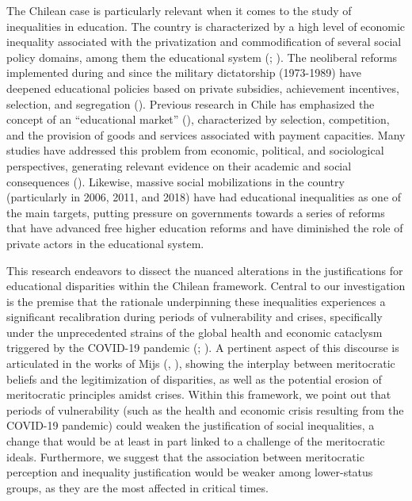 \documentclass[
  12pt,
  a4paper,
]{article}
\begin{document}
The Chilean case is particularly relevant when it comes to the study of inequalities in education. The country is characterized by a high level of economic inequality associated with the privatization and commodification of several social policy domains, among them the educational system (; ). The neoliberal reforms implemented during and since the military dictatorship (1973-1989) have deepened educational policies based on private subsidies, achievement incentives, selection, and segregation (). Previous research in Chile has emphasized the concept of an ``educational market'' (), characterized by selection, competition, and the provision of goods and services associated with payment capacities. Many studies have addressed this problem from economic, political, and sociological perspectives, generating relevant evidence on their academic and social consequences (). Likewise, massive social mobilizations in the country (particularly in 2006, 2011, and 2018) have had educational inequalities as one of the main targets, putting pressure on governments towards a series of reforms that have advanced free higher education reforms and have diminished the role of private actors in the educational system.

This research endeavors to dissect the nuanced alterations in the justifications for educational disparities within the Chilean framework. Central to our investigation is the premise that the rationale underpinning these inequalities experiences a significant recalibration during periods of vulnerability and crises, specifically under the unprecedented strains of the global health and economic cataclysm triggered by the COVID-19 pandemic (; ). A pertinent aspect of this discourse is articulated in the works of Mijs (, ), showing the interplay between meritocratic beliefs and the legitimization of disparities, as well as the potential erosion of meritocratic principles amidst crises. Within this framework, we point out that periods of vulnerability (such as the health and economic crisis resulting from the COVID-19 pandemic) could weaken the justification of social inequalities, a change that would be at least in part linked to a challenge of the meritocratic ideals. Furthermore, we suggest that the association between meritocratic perception and inequality justification would be weaker among lower-status groups, as they are the most affected in critical times.
\end{document}

